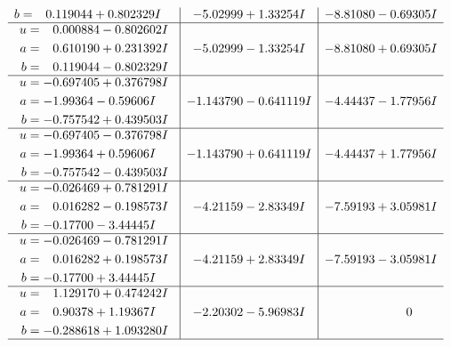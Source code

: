 \documentclass[1p]{elsarticle_modified}
\theoremstyle{definition}
\begin{document}
$$\begin{array}{c|c|c}
\begin{aligned}
b &= \phantom{-}0.119044 + 0.802329 I\end{aligned}
 & -5.02999 + 1.33254 I & -8.81080 - 0.69305 I \\ \hline\begin{aligned}
u &= \phantom{-}0.000884 - 0.802602 I \\
a &= \phantom{-}0.610190 + 0.231392 I \\
b &= \phantom{-}0.119044 - 0.802329 I\end{aligned}
 & -5.02999 - 1.33254 I & -8.81080 + 0.69305 I \\ \hline\begin{aligned}
u &= -0.697405 + 0.376798 I \\
a &= -1.99364 - 0.59606 I \\
b &= -0.757542 + 0.439503 I\end{aligned}
 & -1.143790 - 0.641119 I & -4.44437 - 1.77956 I \\ \hline\begin{aligned}
u &= -0.697405 - 0.376798 I \\
a &= -1.99364 + 0.59606 I \\
b &= -0.757542 - 0.439503 I\end{aligned}
 & -1.143790 + 0.641119 I & -4.44437 + 1.77956 I \\ \hline\begin{aligned}
u &= -0.026469 + 0.781291 I \\
a &= \phantom{-}0.016282 - 0.198573 I \\
b &= -0.17700 - 3.44445 I\end{aligned}
 & -4.21159 - 2.83349 I & -7.59193 + 3.05981 I \\ \hline\begin{aligned}
u &= -0.026469 - 0.781291 I \\
a &= \phantom{-}0.016282 + 0.198573 I \\
b &= -0.17700 + 3.44445 I\end{aligned}
 & -4.21159 + 2.83349 I & -7.59193 - 3.05981 I \\ \hline\begin{aligned}
u &= \phantom{-}1.129170 + 0.474242 I \\
a &= \phantom{-}0.90378 + 1.19367 I \\
b &= -0.288618 + 1.093280 I\end{aligned}
 & -2.20302 - 5.96983 I & \phantom{-0.000000 } 0\\
 \hline 
 \end{array}$$\newpage$$\begin{array}{c|c|c}  

\end{array}$$
\end{document}
